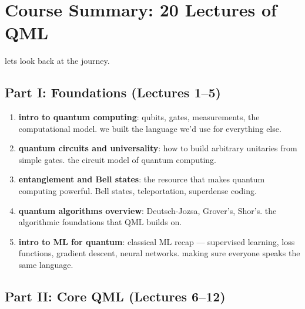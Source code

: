 \documentclass[11pt,a4paper]{article}
\theoremstyle{definition}
\theoremstyle{remark}
\begin{document}
\section{Course Summary: 20 Lectures of QML}

lets look back at the journey.

\subsection{Part I: Foundations (Lectures 1--5)}

\begin{enumerate}[label=\textbf{Lec \arabic*:}]
    \item \textbf{intro to quantum computing}: qubits, gates, measurements, the computational model. we built the language we'd use for everything else.

    \item \textbf{quantum circuits and universality}: how to build arbitrary unitaries from simple gates. the circuit model of quantum computing.

    \item \textbf{entanglement and Bell states}: the resource that makes quantum computing powerful. Bell states, teleportation, superdense coding.

    \item \textbf{quantum algorithms overview}: Deutsch-Jozsa, Grover's, Shor's. the algorithmic foundations that QML builds on.

    \item \textbf{intro to ML for quantum}: classical ML recap --- supervised learning, loss functions, gradient descent, neural networks. making sure everyone speaks the same language.
\end{enumerate}

\subsection{Part II: Core QML (Lectures 6--12)}
\end{document}
